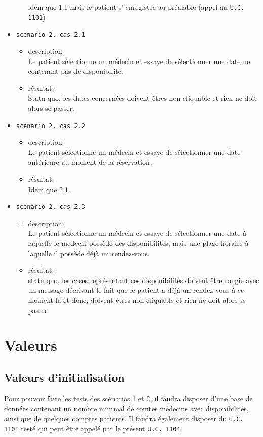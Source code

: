 \documentclass[a4paper, 11pt]{report}
\begin{document}
\begin{itemize}
\begin{itemize}
					idem que 1.1 mais le patient s’ enregistre au préalable
					(appel au \texttt{U.C. 1101})\\
			\end{itemize}
		\item[] \texttt{scénario 2. cas 2.1}
			\begin{itemize}
				\item description:\\
					Le patient sélectionne un médecin et essaye de sélectionner
					une date ne contenant pas de disponibilité.
				\item résultat: \\
					Statu quo, les dates concernées doivent êtres non cliquable
					et rien ne doit alors se passer.\\
			\end{itemize}
		\item[] \texttt{scénario 2. cas 2.2}
			\begin{itemize}
				\item description:\\
					Le patient sélectionne un médecin et essaye de sélectionner
					une date antérieure au moment de la réservation.
				\item résultat: \\
					Idem que 2.1.\\
			\end{itemize}
		\item[] \texttt{scénario 2. cas 2.3}
			\begin{itemize}
				\item description:\\
					Le patient sélectionne un médecin et essaye de sélectionner
					une date à laquelle le médecin possède des disponibilités,
					mais une plage horaire à laquelle il possède déjà un
					rendez-vous.
				\item résultat: \\
					statu quo, les cases représentant ces disponibilités
					doivent être rougie avec un message décrivant le fait que le
					patient a déjà un rendez vous à ce moment là et donc,
					doivent êtres non cliquable et rien ne doit alors se passer.\\
			\end{itemize}
	\end{itemize}
	\newpage
	\section{Valeurs}
	\subsection{Valeurs d'initialisation}
	Pour pouvoir faire les tests des scénarios 1 et 2, il faudra disposer d’une
	base de données contenant un nombre minimal de comtes médecins avec
	disponibilités, ainsi que de quelques comptes patients.
	Il faudra également disposer du \texttt{U.C. 1101} testé qui peut être appelé par le
	présent \texttt{U.C. 1104}.
\end{document}

